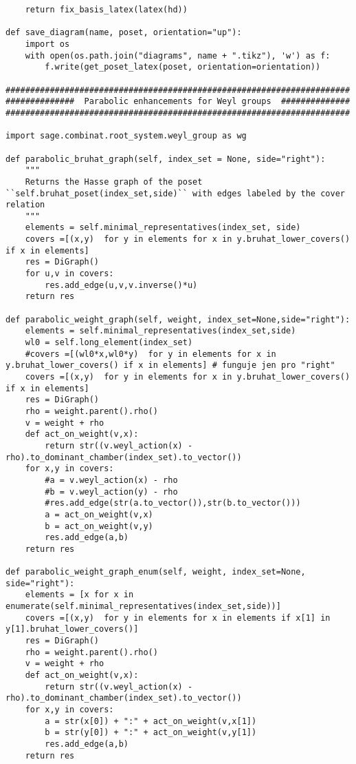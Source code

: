\begin{verbatim}
    return fix_basis_latex(latex(hd))

def save_diagram(name, poset, orientation="up"):
    import os
    with open(os.path.join("diagrams", name + ".tikz"), 'w') as f:
        f.write(get_poset_latex(poset, orientation=orientation))

######################################################################
##############  Parabolic enhancements for Weyl groups  ##############
######################################################################

import sage.combinat.root_system.weyl_group as wg

def parabolic_bruhat_graph(self, index_set = None, side="right"):
    """
    Returns the Hasse graph of the poset ``self.bruhat_poset(index_set,side)`` with edges labeled by the cover relation
    """
    elements = self.minimal_representatives(index_set, side)
    covers =[(x,y)  for y in elements for x in y.bruhat_lower_covers() if x in elements]
    res = DiGraph()
    for u,v in covers:
        res.add_edge(u,v,v.inverse()*u)
    return res

def parabolic_weight_graph(self, weight, index_set=None,side="right"):
    elements = self.minimal_representatives(index_set,side)
    wl0 = self.long_element(index_set)
    #covers =[(wl0*x,wl0*y)  for y in elements for x in y.bruhat_lower_covers() if x in elements] # funguje jen pro "right"
    covers =[(x,y)  for y in elements for x in y.bruhat_lower_covers() if x in elements]
    res = DiGraph()
    rho = weight.parent().rho()
    v = weight + rho
    def act_on_weight(v,x):
        return str((v.weyl_action(x) - rho).to_dominant_chamber(index_set).to_vector())
    for x,y in covers:
        #a = v.weyl_action(x) - rho
        #b = v.weyl_action(y) - rho
        #res.add_edge(str(a.to_vector()),str(b.to_vector()))
        a = act_on_weight(v,x)
        b = act_on_weight(v,y)
        res.add_edge(a,b)
    return res

def parabolic_weight_graph_enum(self, weight, index_set=None, side="right"):
    elements = [x for x in enumerate(self.minimal_representatives(index_set,side))]
    covers =[(x,y)  for y in elements for x in elements if x[1] in y[1].bruhat_lower_covers()]
    res = DiGraph()
    rho = weight.parent().rho()
    v = weight + rho
    def act_on_weight(v,x):
        return str((v.weyl_action(x) - rho).to_dominant_chamber(index_set).to_vector())
    for x,y in covers:
        a = str(x[0]) + ":" + act_on_weight(v,x[1])
        b = str(y[0]) + ":" + act_on_weight(v,y[1])
        res.add_edge(a,b)
    return res


\end{verbatim}
